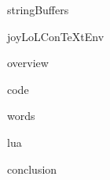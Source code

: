 
\usemodule[t-diSimp]

\startDiSimpComponent stringBuffers

\diSimpEnvironment joyLoLConTeXtEnv

\startJoyLoLCoAlg[title=String buffers][stringBuffers]

\diSimpComponent overview

\diSimpComponent code

\diSimpComponent words

\diSimpComponent lua

\diSimpComponent conclusion

\stopJoyLoLCoAlg

\stopDiSimpComponent
